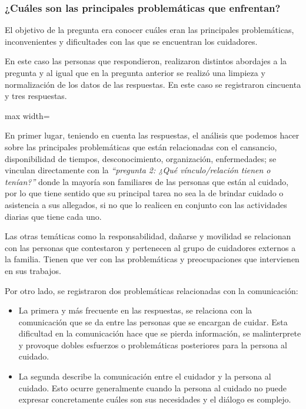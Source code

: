 \documentclass[a4paper,12pt]{article}
\newcommand{\saltolinea}{\par\vspace{\baselineskip}}
\begin{document}
    \subsubsection{¿Cuáles son las principales problemáticas que enfrentan?}
    \par El objetivo de la pregunta era conocer cuáles eran las principales problemáticas, inconvenientes y dificultades con las que se encuentran los cuidadores.
    \par En este caso las personas que respondieron, realizaron distintos abordajes a la pregunta y al igual que en la pregunta anterior se realizó una limpieza y normalización de los datos de las respuestas. En este caso se registraron cincuenta y tres respuestas.
    \newline
        \begin{adjustbox}{max width=\textwidth}
        \end{adjustbox} 
    \saltolinea
    \par En primer lugar, teniendo en cuenta las respuestas, el análisis que podemos hacer sobre las principales problemáticas que están relacionadas con el cansancio, disponibilidad de tiempos, desconocimiento, organización, enfermedades; se vinculan directamente con la \textit{“pregunta 2: ¿Qué vínculo/relación tienen o tenían?”} donde la mayoría son familiares de las personas que están al cuidado, por lo que tiene sentido que su principal tarea no sea la de brindar cuidado o asistencia a sus allegados, si no que lo realicen en conjunto con las actividades diarias que tiene cada uno.
    \par Las otras temáticas como la responsabilidad, dañarse y movilidad se relacionan con las personas que contestaron y pertenecen al grupo de cuidadores externos a la familia. Tienen que ver con las problemáticas y preocupaciones que intervienen en sus trabajos.
    \par Por otro lado, se registraron dos problemáticas relacionadas con la comunicación:
    \begin{itemize}
        \item La primera y más frecuente en las respuestas, se relaciona con la comunicación que se da entre las personas que se encargan de cuidar. Esta dificultad en la comunicación hace que se pierda información, se malinterprete y provoque dobles esfuerzos o problemáticas posteriores para la persona al cuidado.
        \item La segunda describe la comunicación entre el cuidador y la persona al cuidado. Esto ocurre generalmente cuando la persona al cuidado no puede expresar concretamente cuáles son sus necesidades y el diálogo es complejo.
    \end{itemize}
\end{document}
